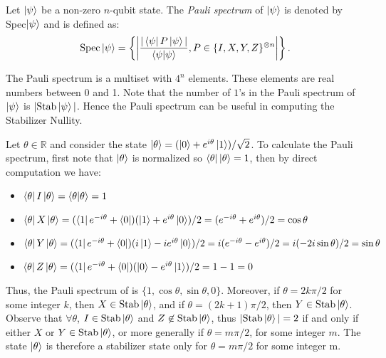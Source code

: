 \documentclass[12pt]{dalthesis}
\begin{document}
\begin{definition}
Let $\ket{\psi}$ be a non-zero $n$-qubit state. The \emph{Pauli spectrum} of $\ket{\psi}$ is denoted by Spec$\ket{\psi}$ and is defined as:
\begin{equation*}
\text{Spec}\ket{\psi} = \left\{ \bigg| \frac{|\bra{\psi}P\ket{\psi}|}{\braket{\psi|\psi}}, P \in \{I, X, Y, Z\}^{\otimes n} \bigg| \right\}.
\end{equation*}
\end{definition}

The Pauli spectrum is a multiset with $4^n$ elements. These elements are real numbers between 0 and 1. Note that the number of $1$'s in the Pauli spectrum of $\ket{\psi}$ is $|\text{Stab}\ket{\psi}|$. Hence the Pauli spectrum can be useful in computing the Stabilizer Nullity.

\begin{example}
Let $\theta \in \mathbb{R}$ and consider the state $\ket{\theta} = (\ket{0} + e^{i\theta}\ket{1})/\sqrt{2}$. To calculate the Pauli spectrum, first note that $\ket{\theta}$ is normalized so $\bra{\theta}\ket{\theta} = 1$, then by direct computation we have:
\begin{itemize}
\item $\bra{\theta}I\ket{\theta} = \braket{\theta|\theta} = 1$
\item $\bra{\theta}X\ket{\theta} = (\bra{1}e^{-i\theta} + \bra{0})(\ket{1} + e^{i\theta}\ket{0})/2 = (e^{-i\theta} + e^{i\theta})/2 = \cos\theta$
\item $\bra{\theta}Y\ket{\theta} = (\bra{1}e^{-i\theta} + \bra{0})(i\ket{1} - ie^{i\theta}\ket{0})/2 = i(e^{-i\theta} - e^{i\theta})/2 = i(-2i\sin\theta)/2 = \sin\theta$
\item $\bra{\theta}Z\ket{\theta} = (\bra{1}e^{-i\theta} + \bra{0})(\ket{0} - e^{i\theta}\ket{1})/2 = 1 - 1 = 0$
\end{itemize} 
Thus, the Pauli spectrum of is $\{1, \cos\theta, \sin\theta, 0\}$. Moreover, if $\theta = 2k\pi /2$ for some integer $k$, then $X \in \text{Stab}\ket{\theta}$, and if $\theta = (2k+1)\pi /2$, then $Y \in \text{Stab}\ket{\theta}$. Observe that $\forall \theta$, $I \in \text{Stab}\ket{\theta}$ and $Z \not\in \text{Stab}\ket{\theta}$, thus $|\text{Stab}\ket{\theta}| = 2$ if and only if either $X$ or $Y \in \text{Stab}\ket{\theta}$, or more generally if $\theta = m \pi /2$, for some integer $m$. The state $\ket{\theta}$ is therefore a stabilizer state only for $\theta = m \pi/2$ for some integer m.
\end{example}
\end{document}
